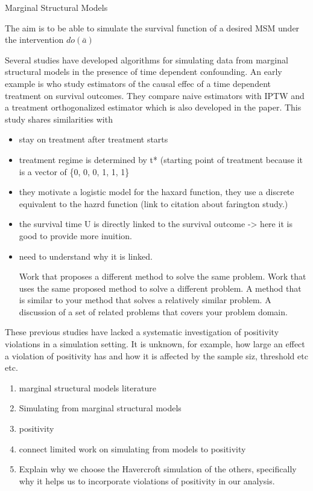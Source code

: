 \documentclass[11pt]{article}
\begin{document}
Marginal Structural Models

The aim is to be able to simulate the survival function of a desired MSM
under the intervention \(do(\bar a)\)

Several studies have developed algorithms for simulating data from
marginal structural models in the presence of time dependent
confounding. An early example is \citet{bryan2004} who study estimators
of the causal effec of a time dependent treatment on survival outcomes.
They compare naive estimators with IPTW and a treatment orthogonalized
estimator which is also developed in the paper. This study shares
similarities with \citet{Havercroft2012}

\begin{itemize}
\item
  stay on treatment after treatment starts
\item
  treatment regime is determined by t* (starting point of treatment
  because it is a vector of \{0, 0, 0, 1, 1, 1\}
\item
  they motivate a logistic model for the haxard function, they use a
  discrete equivalent to the hazrd function (link to citation about
  farington study.)
\item
  the survival time U is directly linked to the survival outcome
  -\textgreater{} here it is good to provide more inuition.
\item
  need to understand why it is linked.

  Work that proposes a different method to solve the same problem. Work
  that uses the same proposed method to solve a different problem. A
  method that is similar to your method that solves a relatively similar
  problem. A discussion of a set of related problems that covers your
  problem domain.
\end{itemize}

These previous studies have lacked a systematic investigation of
positivity violations in a simulation setting. It is unknown, for
example, how large an effect a violation of positivity has and how it is
affected by the sample siz, threshold etc etc.

\begin{enumerate}
\def\labelenumi{\arabic{enumi}.}
\item
  marginal structural models literature
\item
  Simulating from marginal structural models
\item
  positivity
\item
  connect limited work on simulating from models to positivity
\item
  Explain why we choose the Havercroft simulation of the others,
  specifically why it helps us to incorporate violations of positivity
  in our analysis.
\end{enumerate}
\end{document}

